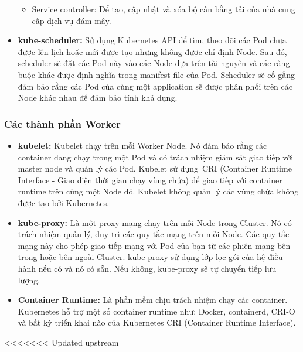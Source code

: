 \documentclass[12pt,a4paper]{report}
\begin{document}
\begin{itemize}
\begin{itemize}
	\item Service controller: Để tạo, cập nhật và xóa bộ cân bằng tải của nhà cung cấp dịch vụ đám mây.
	\end{itemize}
	
	\item \textbf{kube-scheduler:}
	\subitem
	Sử dụng Kubernetes API để tìm, theo dõi các Pod chưa được lên lịch hoặc mới được tạo nhưng không được chỉ định Node. Sau đó, scheduler sẽ đặt các Pod này vào các Node dựa trên tài nguyên và các ràng buộc khác được định nghĩa trong manifest file của Pod. Scheduler sẽ cố gắng đảm bảo rằng các Pod của cùng một application sẽ được phân phối trên các Node khác nhau để đảm bảo tính khả dụng.
	
	\hspace{0.8cm}{Các yếu tố được tính đến để đưa ra quyết định lập lịch bao gồm: yêu cầu tài nguyên cá nhân và tập thể, các ràng buộc về phần cứng / phần mềm / chính sách, thông số kỹ thuật về mối quan hệ và chống mối quan hệ, vị trí dữ liệu, can thiệp giữa khối lượng công việc và thời hạn.}
	\end{itemize}

	\subsubsection{Các thành phần Worker}
	\smallskip
	\hspace{1cm}{Có nhiệm vụ xử lý khối lượng công việc của application trong cluster, duy trì các nhóm đang chạy và cung cấp môi trường runtime cho Kubernetes. Worker sẽ bao gồm 3 thành phần chính sau:}
	\begin{itemize}
		\item \textbf{kubelet:}
		\subitem
		Kubelet chạy trên mỗi Worker Node. Nó đảm bảo rằng các container đang chạy trong một Pod và có trách nhiệm giám sát giao tiếp với master node và quản lý các Pod. Kubelet sử dụng CRI (Container Runtime Interface - Giao diện thời gian chạy vùng chứa) để giao tiếp với container runtime trên cùng một Node đó. Kubelet không quản lý các vùng chứa không được tạo bởi Kubernetes.
		
		\item \textbf{kube-proxy:}
		\subitem
		Là một proxy mạng chạy trên mỗi Node trong Cluster. Nó có trách nhiệm quản lý, duy trì các quy tắc mạng trên mỗi Node. Các quy tắc mạng này cho phép giao tiếp mạng với Pod của bạn từ các phiên mạng bên trong hoặc bên ngoài Cluster. kube-proxy sử dụng lớp lọc gói của hệ điều hành nếu có và nó có sẵn. Nếu không, kube-proxy sẽ tự chuyển tiếp lưu lượng.
		
		\item \textbf{Container Runtime:}
		\subitem
		Là phần mềm chịu trách nhiệm chạy các container. Kubernetes hỗ trợ một số container runtime như: Docker, containerd, CRI-O và bất kỳ triển khai nào của Kubernetes CRI (Container Runtime Interface).
	\end{itemize}
<<<<<<< Updated upstream
=======
	
\end{document}

